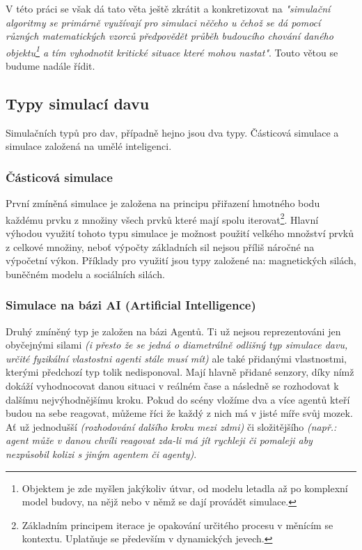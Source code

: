 \documentclass[czech,public,dept460,male,cpdeclaration]{diploma}
\begin{document}
V této práci se však dá tato věta ještě zkrátit a konkretizovat na \textit{"simulační algoritmy se primárně využívají pro simulaci něčeho u čehož se dá pomocí různých matematických vzorců předpovědět průběh budoucího chování daného objektu\footnote{Objektem je zde myšlen jakýkoliv útvar, od modelu letadla až po komplexní model budovy, na nějž nebo v němž se dají provádět simulace.} a tím vyhodnotit kritické situace které mohou nastat"}. Touto větou se budume nadále řídit.

\subsection{Typy simulací davu}
Simulačních typů pro dav, případně hejno jsou dva typy. Částicová simulace a simulace založená na umělé inteligenci. \cite{linkToBachelor1}

\subsubsection{Částicová simulace}
První zmíněná simulace je založena na principu přiřazení hmotného bodu každému prvku z množiny všech prvků které mají spolu iterovat\footnote{Základním principem iterace je opakování určitého procesu v měnícím se kontextu. Uplatňuje se především v dynamických jevech.\cite{linkToIteration}}. Hlavní výhodou využití tohoto typu simulace je možnost použití velkého množství prvků z celkové množiny, neboť výpočty základních sil nejsou příliš náročné na výpočetní výkon. Příklady pro využití jsou typy založené na: magnetických silách, buněčném modelu a sociálních silách. \cite{linkToBachelor1}

\subsubsection{Simulace na bázi AI (Artificial Intelligence)}\label{sec:simulace-na-bazi-ai-artificial-intelligence}
Druhý zmíněný typ je založen na bázi Agentů. Ti už nejsou reprezentováni jen obyčejnými silami \textit{(i přesto že se jedná o diametrálně odlišný typ simulace davu, určité fyzikální vlastostni agenti stále musí mít)} ale také přidanými vlastnostmi, kterými předchozí typ tolik nedisponoval. Mají hlavně přidané senzory, díky nímž dokáží vyhodnocovat danou situaci v reálném čase a následně se rozhodovat k dalšímu nejvýhodnějšímu kroku. Pokud do scény vložíme dva a více agentů kteří budou na sebe reagovat, můžeme říci že každý z nich má v jisté míře svůj mozek. Ať už jednodušší \textit{(rozhodování dalšího kroku mezi zdmi)} či složitějšího \textit{(např.: agent může v danou chvíli reagovat zda-li má jít rychleji či pomaleji aby nezpůsobil kolizi s jiným agentem či agenty)}.
\end{document}
